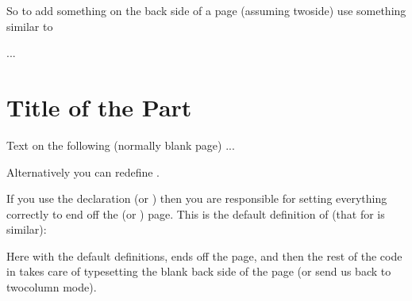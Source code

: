 So to add something on the back side of a \cmd{\part} page (assuming
twoside) use something similar to
\begin{lcode}
...
\nopartblankpage
\part{Title of the Part}
\thispagestyle{simple}
Text on the following (normally blank page)
\clearpage
...
\end{lcode}
    Alternatively you can redefine \cmd{\partpageend}.

   If you use the declaration \cmd{\nopartblankpage} (or \cmd{\nobookblankpage})
then you are responsible for setting everything correctly to end off the
\cmd{\part} (or \cmd{\book}) page. This is the default definition of
\cmd{\partpageend} (that for \cmd{\bookpageend} is similar):
\begin{lcode}
\newcommand{\partpageend}{%
  \afterpartskip
  \ifm@mnopartnewpage%
  \else%
    \if@twoside
      \if@openright%
        \null
        \thispagestyle{afterpart}%
        \newpage
      \fi
    \fi
  \fi
  \if@tempswa%
    \twocolumn
  \fi}
\end{lcode}
Here with the default definitions, \cmd{\afterpartskip} ends off the
\cmd{\part} page, and then the rest of the code in \cmd{\partpageend}
takes care of typesetting the blank back side of the \cmd{\part} page
(or send us back to twocolumn mode).

